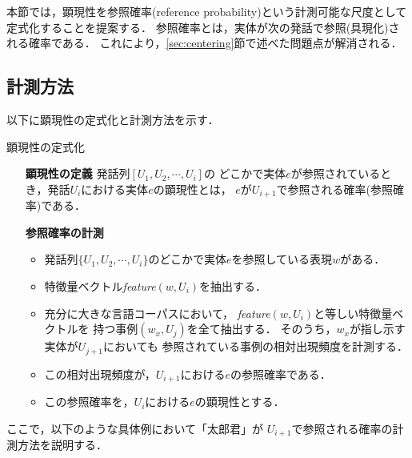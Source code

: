 本節では，顕現性を参照確率(reference probability)という計測可能な尺度として
定式化することを提案する．
参照確率とは，実体が次の発話で参照(具現化)される確率である．
これにより，\ref{sec:centering}節で述べた問題点が解消される．

\subsection{計測方法}
以下に顕現性の定式化と計測方法を示す．

\begin{itembox}[l]{顕現性の定式化}
\begin{itemize}
\item[{\bf 顕現性の定義}　] 発話列$[U_1, U_2, \cdots, U_i]$の
どこかで実体$e$が参照されているとき，発話$U_i$における実体$e$の顕現性とは，
$e$が$U_{i+1}$で参照される確率(参照確率)である．
\item[{\bf 参照確率の計測}] 　
\begin{itemize} 
\item 発話列$\{U_1, U_2, \cdots, U_i\}$のどこかで実体$e$を参照している表現$w$がある．
\item 特徴量ベクトル{\it feature}$(w, U_i)$を抽出する．
\item 充分に大きな言語コーパスにおいて，
{\it feature}$(w, U_i)$と等しい特徴量ベクトルを
持つ事例$(w_x, U_j)$を全て抽出する．
そのうち，$w_x$が指し示す実体が$U_{j+1}$においても
参照されている事例の相対出現頻度を計測する．
\item この相対出現頻度が，$U_{i+1}$における$e$の参照確率である．
\item この参照確率を，$U_i$における$e$の顕現性とする．
\end{itemize}
\end{itemize}
\end{itembox}
ここで，以下のような具体例において「太郎君」が
$U_{i+1}$で参照される確率の計測方法を説明する．

